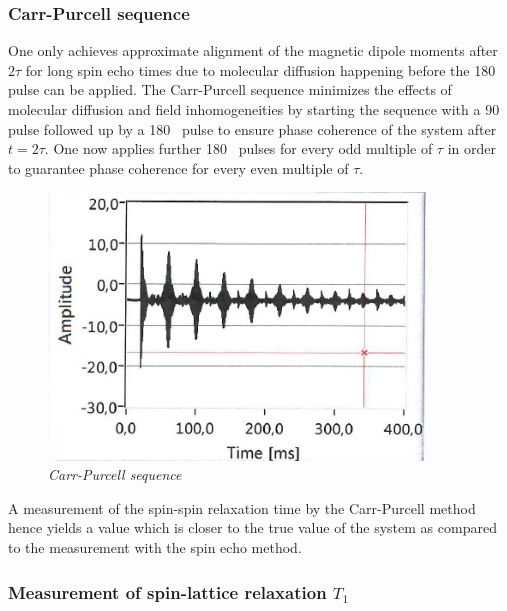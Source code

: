 \subsubsection{Carr-Purcell sequence}
\label{sec:2}
One only achieves approximate alignment of the magnetic dipole moments after $2 \tau$ for long spin echo times due to molecular diffusion happening before the 180 \textdegree\, pulse can be applied. The Carr-Purcell sequence minimizes the effects of molecular diffusion and field inhomogeneities by starting the sequence with a 90 \textdegree\, pulse followed up by a 180 \textdegree\, pulse to ensure phase coherence of the system after $t=2\tau$. One now applies further 180 \textdegree\, pulses for every odd multiple of $\tau$ in order to guarantee phase coherence for every even multiple of $\tau$.
\begin{figure}[h]
	\includegraphics[width=100mm]{CarrPurcell}
	\centering
	\caption{\itshape Carr-Purcell sequence }
	\label{fig:2}
\end{figure} 
\noindent
A measurement of the spin-spin relaxation time by the Carr-Purcell method hence yields a value which is closer to the true value of the system as compared to the measurement with the spin echo method.\cite{manual}
\label{sec:5}

\subsubsection{Measurement of spin-lattice relaxation $T_1$}

